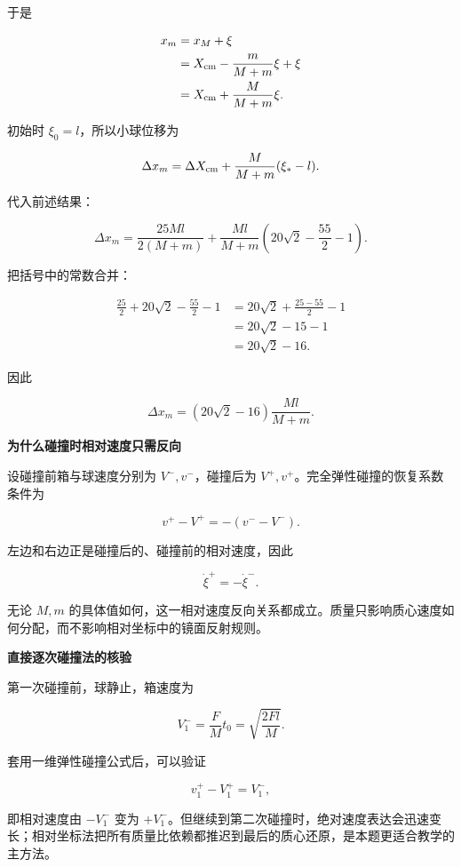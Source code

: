 \documentclass[12pt,a4paper,UTF8]{ctexart}
\begin{document}
于是

\[
\begin{aligned}
x_m
&=x_M+\xi\\
&=X_{\rm cm}-\frac{m}{M+m}\xi+\xi\\
&=X_{\rm cm}+\frac{M}{M+m}\xi.
\end{aligned}
\]

初始时 \(\xi_0=l\)，所以小球位移为

\[
\Delta x_m=\Delta X_{\rm cm}+\frac{M}{M+m}(\xi_* -l).
\]

代入前述结果：

\[
\Delta x_m
=\frac{25Ml}{2(M+m)}
+\frac{Ml}{M+m}\left(20\sqrt2-\frac{55}{2}-1\right).
\]

把括号中的常数合并：

\[
\begin{aligned}
\frac{25}{2}+20\sqrt2-\frac{55}{2}-1
&=20\sqrt2+\frac{25-55}{2}-1\\
&=20\sqrt2-15-1\\
&=20\sqrt2-16.
\end{aligned}
\]

因此

\[
\boxed{
\Delta x_m=(20\sqrt2-16)\frac{Ml}{M+m}
}.
\]

\textbf{为什么碰撞时相对速度只需反向}

设碰撞前箱与球速度分别为 \(V^-,v^-\)，碰撞后为
\(V^+,v^+\)。完全弹性碰撞的恢复系数条件为

\[v^+-V^+=-(v^--V^-).\]

左边和右边正是碰撞后的、碰撞前的相对速度，因此

\[\dot\xi^+=-\dot\xi^-.\]

无论 \(M,m\)
的具体值如何，这一相对速度反向关系都成立。质量只影响质心速度如何分配，而不影响相对坐标中的镜面反射规则。

\textbf{直接逐次碰撞法的核验}

第一次碰撞前，球静止，箱速度为

\[V^-_1=\frac FMt_0=\sqrt{\frac{2Fl}{M}}.\]

套用一维弹性碰撞公式后，可以验证

\[v_1^+-V_1^+=V_1^-,\]

即相对速度由 \(-V_1^-\) 变为
\(+V_1^-\)。但继续到第二次碰撞时，绝对速度表达会迅速变长；相对坐标法把所有质量比依赖都推迟到最后的质心还原，是本题更适合教学的主方法。
\end{document}
